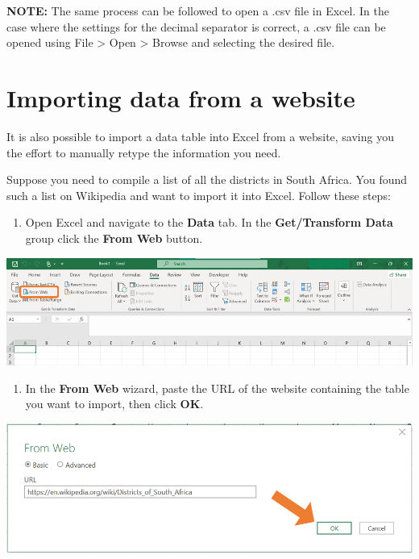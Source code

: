 \documentclass[
]{book}
\providecommand{\tightlist}{%
  \setlength{\itemsep}{0pt}\setlength{\parskip}{0pt}}
\begin{document}
\textbf{NOTE:} The same process can be followed to open a .csv file in Excel. In the case where the settings for the decimal separator is correct, a .csv file can be opened using File \textgreater{} Open \textgreater{} Browse and selecting the desired file.

\section{Importing data from a website}\label{importing-data-from-a-website}

It is also possible to import a data table into Excel from a website, saving you the effort to manually retype the information you need.

Suppose you need to compile a list of all the districts in South Africa. You found such a list on Wikipedia and want to import it into Excel. Follow these steps:

\begin{enumerate}
\def\labelenumi{\arabic{enumi}.}
\tightlist
\item
  Open Excel and navigate to the \textbf{Data} tab. In the \textbf{Get/Transform Data} group click the \textbf{From Web} button.
\end{enumerate}

\begin{center}\includegraphics[width=0.7\linewidth]{Figures/web_1} \end{center}

\begin{enumerate}
\def\labelenumi{\arabic{enumi}.}
\setcounter{enumi}{1}
\tightlist
\item
  In the \textbf{From Web} wizard, paste the URL of the website containing the table you want to import, then click \textbf{OK}.
\end{enumerate}

\begin{center}\includegraphics[width=0.6\linewidth]{Figures/web_2} \end{center}
\end{document}
